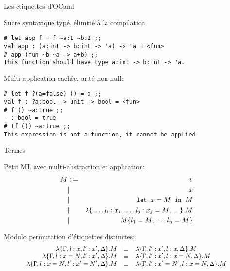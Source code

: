 \documentclass{beamer}
\renewcommand{\emph}[1]{\alert{#1}}
\newcommand{\letin}[3]{\text{\texttt{let }} #1 = #2 \text{\texttt{ in }} #3}
\begin{document}
\begin{frame}[fragile]{Les étiquettes d'OCaml}

\vspace{0.5cm}

  \begin{block}{Sucre syntaxique typé, éliminé à la compilation}
  \vspace{-0.3cm}\begin{verbatim}
# let app f = f ~a:1 ~b:2 ;;
val app : (a:int -> b:int -> 'a) -> 'a = <fun>
# app (fun ~b ~a -> a+b) ;;
This function should have type a:int -> b:int -> 'a.
  \end{verbatim}
  \end{block}

  \begin{block}{Multi-application cachée, arité non nulle}
  \vspace{-0.3cm}\begin{verbatim}
# let f ?(a=false) () = a ;;
val f : ?a:bool -> unit -> bool = <fun>
# f () ~a:true ;;
- : bool = true
# (f ()) ~a:true ;;
This expression is not a function, it cannot be applied.
  \end{verbatim}
  \end{block}

\end{frame}

\begin{frame}{Termes}

Petit ML avec multi-abstraction et application:
\begin{eqnarray*}
  M &::=& v \\
  &|& x \\
  &|& \letin{x}{M}{M} \\
  &|& \lambda \{\ldots, l_i:x_i, \ldots, l_j:x_j=M, \ldots\}.M \\
  &|& M\{l_1=M,\ldots,l_n=M\}
\end{eqnarray*}

\vfill

Modulo \emph{permutation d'étiquettes distinctes}:
\[ \small
 \begin{array}{rcl}
 \lambda \{ \Gamma, l:x, l':x', \Delta \}.M & \equiv &
 \lambda \{ \Gamma, l':x', l:x, \Delta \}.M \\
 \lambda \{ \Gamma, l:x=N, l':x', \Delta \}.M & \equiv &
 \lambda \{ \Gamma, l':x', l:x=N, \Delta \}.M \\
 \lambda \{ \Gamma, l:x=N, l':x'=N', \Delta \}.M & \equiv &
 \lambda \{ \Gamma, l':x'=N', l:x=N, \Delta \}.M
 \end{array}
\]

\end{frame}
\end{document}
